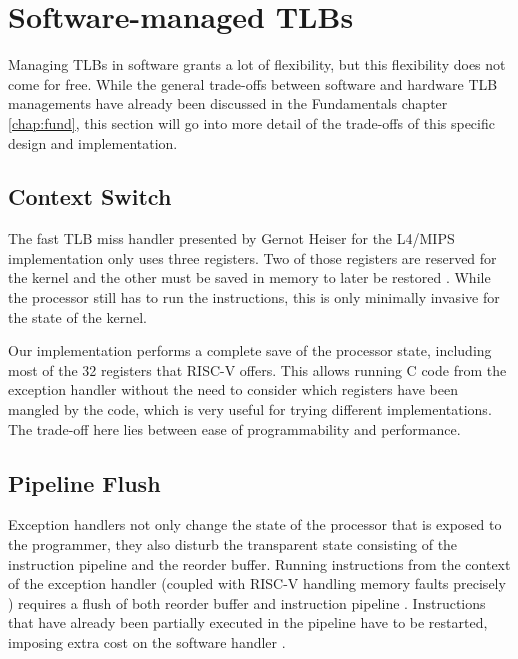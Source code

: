 \section{Software-managed TLBs}
Managing TLBs in software grants a lot of flexibility, but this flexibility does not come
for free. While the general trade-offs between software and hardware TLB managements have
already been discussed in the Fundamentals chapter \ref{chap:fund}, this section will
go into more detail of the trade-offs of this specific design and implementation.

\subsection{Context Switch} The fast TLB miss handler presented by Gernot Heiser for the
L4/MIPS implementation only uses three registers. Two of those registers are reserved
for the kernel and the other must be saved in memory to later be restored \cite{heiserAnatomyHighPerformanceMicrokernel}.
While the processor still has to run the instructions, this is only minimally invasive
for the state of the kernel.

Our implementation performs a complete save of the processor state, including most of the
32 registers that RISC-V offers.
This allows running C code from the exception handler without the need to consider which
registers have been mangled by the code, which is very useful for trying different implementations.
The trade-off here lies between ease of programmability and performance.

\subsection{Pipeline Flush} Exception handlers not only change the state of the processor that is
exposed to the programmer, they also disturb the transparent state consisting of the
instruction pipeline and the reorder buffer.
Running instructions from the context of the exception handler (coupled with RISC-V handling
memory faults precisely \cite{RISCVInstructionSet}) requires a flush of both reorder buffer
and instruction pipeline \cite{jacobVirtualMemoryContemporary1998}.
Instructions that have already been partially executed in the pipeline have to be restarted,
imposing extra cost on the software handler \cite{jacob1998look}.


